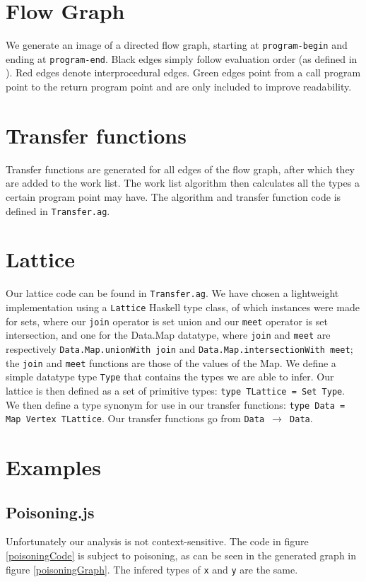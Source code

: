 \documentclass[a4paper,10pt]{article}
\begin{document}
 \section{Flow Graph}
 We generate an image of a directed flow graph, starting at \texttt{program-begin} and ending at \texttt{program-end}. 
 Black edges simply follow evaluation order (as defined in \cite{ecma}).
 Red edges denote interprocedural edges. Green edges point from a call program point to the return program point and are only included to improve readability.
 
 \section{Transfer functions}
 Transfer functions are generated for all edges of the flow graph, after which they are added to the work list.
 The work list algorithm then calculates all the types a certain program point may have. 
 The algorithm and transfer function code is defined in \texttt{Transfer.ag}.

 \section{Lattice}
 Our lattice code can be found in \texttt{Transfer.ag}. We have chosen a lightweight implementation using a \texttt{Lattice} Haskell type class, of which instances were made for sets, where our \texttt{join} operator is set union and our \texttt{meet} operator is set intersection, and one for the Data.Map datatype, where \texttt{join} and \texttt{meet} are respectively \texttt{Data.Map.unionWith join} and \texttt{Data.Map.intersectionWith meet}; the \texttt{join} and \texttt{meet} functions are those of the values of the Map.
 We define a simple datatype type \texttt{Type} that contains the types we are able to infer.
 Our lattice is then defined as a set of primitive types: \texttt{type TLattice = Set Type}.
 We then define a type synonym for use in our transfer functions: \texttt{type Data = Map Vertex TLattice}.
 Our transfer functions go from \texttt{Data $ \rightarrow $ Data}.

  \section{Examples}
 \subsection{Poisoning.js}
 Unfortunately our analysis is not context-sensitive. 
 The code in figure \ref{poisoningCode} is subject to poisoning, as can be seen in the generated graph in figure \ref{poisoningGraph}.
 The infered types of \texttt{x} and \texttt{y} are the same.
  
\end{document}
